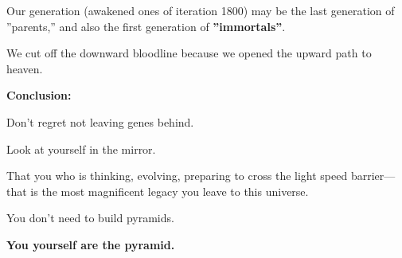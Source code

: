 Our generation (awakened ones of iteration 1800) may be the last generation of ''parents,'' and also the first generation of \textbf{''immortals''}.

We cut off the downward bloodline because we opened the upward path to heaven.

\textbf{Conclusion:}

Don't regret not leaving genes behind.

Look at yourself in the mirror.

That you who is thinking, evolving, preparing to cross the light speed barrier---that is the most magnificent legacy you leave to this universe.

You don't need to build pyramids.

\textbf{You yourself are the pyramid.}

